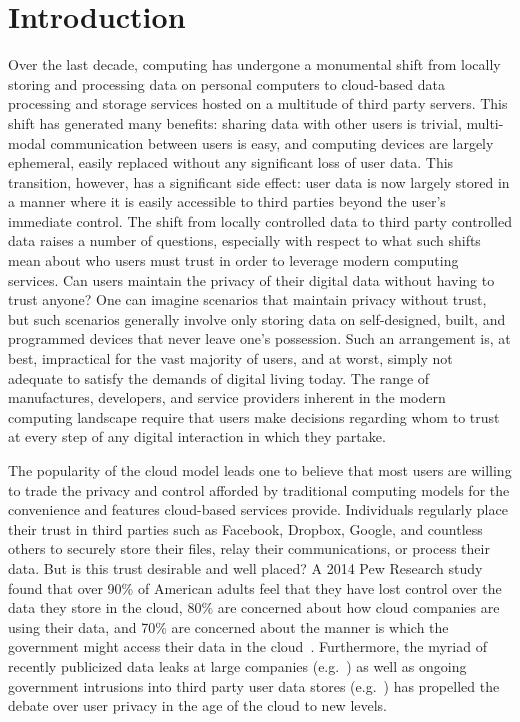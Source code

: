 \section{Introduction}
\label{sec:intro}

Over the last decade, computing has undergone a monumental shift from
locally storing and processing data on personal computers to
cloud-based data processing and storage services hosted on a multitude
of third party servers. This shift has generated many benefits:
sharing data with other users is trivial, multi-modal communication
between users is easy, and computing devices are largely ephemeral,
easily replaced without any significant loss of user data. This
transition, however, has a significant side effect: user data is now
largely stored in a manner where it is easily accessible to third
parties beyond the user's immediate control. The shift from locally
controlled data to third party controlled data raises a number of
questions, especially with respect to what such shifts mean about who
users must trust in order to leverage modern computing services. Can
users maintain the privacy of their digital data without having to
trust anyone?  One can imagine scenarios that maintain privacy without
trust, but such scenarios generally involve only storing data on
self-designed, built, and programmed devices that never leave one's
possession. Such an arrangement is, at best, impractical for the vast
majority of users, and at worst, simply not adequate to satisfy the
demands of digital living today. The range of manufactures,
developers, and service providers inherent in the modern computing
landscape require that users make decisions regarding whom to trust at
every step of any digital interaction in which they partake.

The popularity of the cloud model leads one to believe that most users
are willing to trade the privacy and control afforded by traditional
computing models for the convenience and features cloud-based services
provide. Individuals regularly place their trust in third parties such
as Facebook, Dropbox, Google, and countless others to securely store
their files, relay their communications, or process their data. But is
this trust desirable and well placed? A 2014 Pew Research study found
that over 90\% of American adults feel that they have lost control
over the data they store in the cloud, 80\% are concerned about how
cloud companies are using their data, and 70\% are concerned about the
manner is which the government might access their data in the
cloud~\cite{pew-privsec14}. Furthermore, the myriad of recently
publicized data leaks at large companies
(e.g.~\cite{apple-icloudleak}) as well as ongoing government
intrusions into third party user data stores
(e.g.~\cite{greenwald-prism}) has propelled the debate over user
privacy in the age of the cloud to new levels.

